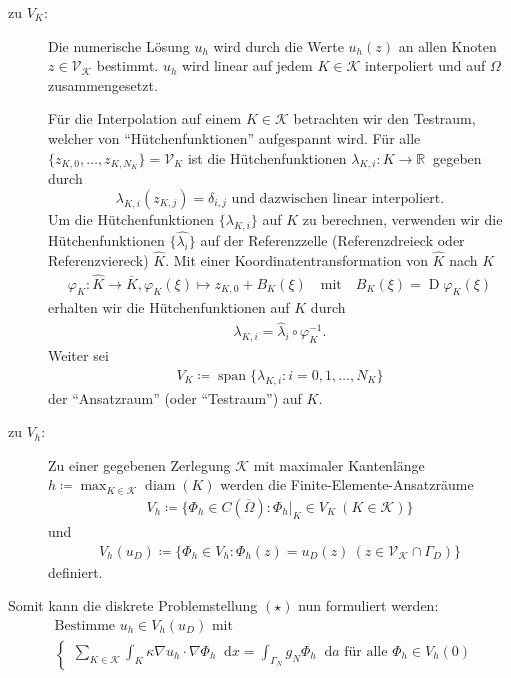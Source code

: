 \documentclass[12pt,a4paper]{scrartcl}
\newcommand{\R}{\mathbb{R}}
\newcommand*\diff{\mathop{}\!\mathrm{d}}
\DeclareMathOperator{\spann}{span}
\DeclareMathOperator{\Jacobi}{D}
\DeclareMathOperator{\diam}{diam}
\newcommand{\defi}[1]{\textcolor{Mygreen}{#1}}
\renewcommand{\phi}{\varphi}
\numberwithin{equation}{section}
\begin{document}
\begin{enumerate}[label=(\roman*)]
\begin{description}
	\item[zu $V_K$:] 
	Die numerische Lösung $u_h$ wird durch die Werte $ u_h(z) $ an allen Knoten $z \in \mathcal{V}_\mathcal{K}$ bestimmt. $ u_h $ wird linear auf jedem $K \in \mathcal{K}$ interpoliert und auf $ \Omega $ zusammengesetzt.
	
	Für die Interpolation auf einem $ K \in \mathcal{K} $ betrachten wir den Testraum, welcher von \enquote{Hütchenfunktionen} aufgespannt wird. Für alle $ \{z_{K,0},\dots, z_{K,N_K} \} = \mathcal{V}_K $ ist die Hütchenfunktionen $ \lambda_{K,i}\colon K \to \R \ $ gegeben durch
		\[
			\lambda_{K,i}(z_{K,j}) = \delta_{i,j}
			\text{ und dazwischen linear interpoliert.}
		\] 
		Um die Hütchenfunktionen $ \{\lambda_{K,i}\} $ auf $ K $ zu berechnen, verwenden wir die Hütchenfunktionen $ \{\hat{\lambda_i}\} $ auf der \defi{Referenzzelle} (Referenzdreieck oder Referenzviereck) $ \hat{K} $. Mit einer Koordinatentransformation von $ \hat{K} $ nach $ K $
		\begin{align*}
			\phi_K\colon \hat{K} \to \overline{K}, \phi_K(\xi) \mapsto z_{K,0} + B_K(\xi) \quad \text{mit} \quad B_K(\xi) = \Jacobi\phi_K(\xi)
		\end{align*}
		erhalten wir die Hütchenfunktionen auf $ K $ durch
		\begin{align*}
			\lambda_{K,i} = \hat{\lambda}_i \circ \phi_K^{-1}.
		\end{align*}
		Weiter sei
		\begin{align*}
			V_K \coloneqq \spann\{\lambda_{K,i}: i=0,1,\dots,N_K\}
		\end{align*}
		der \enquote{Ansatzraum} (oder \enquote{Testraum}) auf $ K $. 
	
\item[zu $ V_h $:] Zu einer gegebenen Zerlegung $\mathcal{K}$ mit \defi{maximaler Kantenlänge} $ h \coloneqq \max_{K \in \mathcal{K}} \diam(K) $ werden die \defi{Finite-Elemente-Ansatzräume} 
	\begin{align*}
		V_h \coloneqq \{ \Phi_h \in C(\overline{\Omega}): \Phi_h|_K \in V_K \ (K \in \mathcal{K})\}
	\end{align*}
	und
	\begin{align*}
		V_h(u_D) \coloneqq \{ \Phi_h \in V_h: \Phi_h(z)=u_D(z) \ (z \in \mathcal{V}_\mathcal{K} \cap \Gamma_D) \}
	\end{align*}
	definiert.
	
\end{description}

Somit kann die diskrete Problemstellung $ (\star) $ nun  formuliert werden:
	\begin{align*}
		&\text{Bestimme } u_h \in V_h(u_D) \text{ mit }\\
		&\begin{cases}
		\sum_{K \in \mathcal{K}} \int_{K} \kappa \nabla u_h \cdot \nabla \Phi_h \diff x = \int_{\Gamma_N} g_N  \Phi_h \diff a \text{ für alle } \Phi_h \in V_h(0)
		\end{cases}
	\end{align*}


\end{enumerate}
\end{document}
